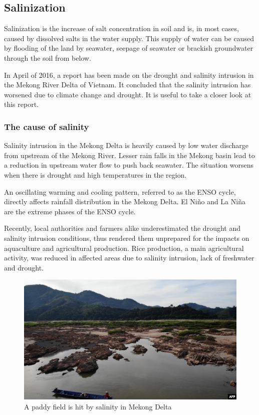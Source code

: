 \newpage
\subsection{Salinization}
Salinization is the increase of salt concentration in soil and is, in most cases, caused by dissolved salts in the water supply. This supply of water can be caused by flooding of the land by seawater, seepage of seawater or brackish groundwater through the soil from below.

In April of 2016, a report has been made on the drought and salinity intrusion in the Mekong River Delta of Vietnam. It concluded that the salinity intrusion has worsened due to climate change and drought. It is useful to take a closer look at this report. \cite{salinity}

\subsubsection{The cause of salinity}
Salinity intrusion in the Mekong Delta is heavily caused by low water discharge from upstream of the Mekong River. Lesser rain falls in the Mekong basin lead to a reduction in upstream water flow to push back seawater. The situation worsens when there is drought and high temperatures in the region.

An oscillating warming and cooling pattern, referred to as the ENSO cycle, directly affects rainfall distribution in the Mekong Delta. El Niño and La Niña are the extreme phases of the ENSO cycle.

Recently, local authorities and farmers alike underestimated the drought and salinity intrusion conditions, thus rendered them unprepared for the impacts on aquaculture and agricultural production. Rice production, a main agricultural activity, was reduced in affected areas due to salinity intrusion, lack of freshwater and drought. 

\begin{figure}[h]
\centering
\includegraphics[scale=0.45]{mekong/12_drought.jpg}
\caption{A paddy field is hit by salinity in Mekong Delta 
\cite{saigononline}}
\end{figure}

